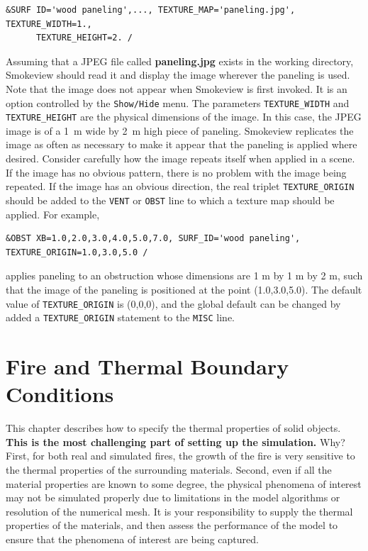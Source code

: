 \documentclass[11pt]{book}
\newcommand{\ct}{\tt\small}
\begin{document}
\footnotesize
\begin{verbatim}
&SURF ID='wood paneling',..., TEXTURE_MAP='paneling.jpg', TEXTURE_WIDTH=1.,
      TEXTURE_HEIGHT=2. /
\end{verbatim}
\normalsize
Assuming that a JPEG file called {\bf paneling.jpg} exists in the
working directory, Smokeview should read it and display the image
wherever the paneling is used.
Note that the image does not appear when Smokeview is first invoked. It is an option controlled by
the {\ct Show/Hide} menu. The parameters {\ct TEXTURE\_WIDTH}
and {\ct TEXTURE\_HEIGHT} are the physical dimensions of the image. In this case,
the JPEG image is of a 1~m wide by 2~m high piece of
paneling. Smokeview replicates the image as often as necessary to
make it appear that the paneling is applied where desired.
Consider carefully how the image repeats itself when
applied in a scene. If the image has no obvious pattern, there is no
problem with the image being repeated. If the image has an obvious
direction, the real triplet {\ct TEXTURE\_ORIGIN} should be added to
the {\ct VENT} or {\ct OBST} line to which a texture map
should be applied. For example,

\footnotesize
\begin{verbatim}
&OBST XB=1.0,2.0,3.0,4.0,5.0,7.0, SURF_ID='wood paneling', TEXTURE_ORIGIN=1.0,3.0,5.0 /
\end{verbatim}
\normalsize
applies paneling to an obstruction whose dimensions are 1 m by
1 m by 2 m, such that the image of the paneling is positioned
at the point (1.0,3.0,5.0). The default value of {\ct TEXTURE\_ORIGIN}
is (0,0,0), and the global default can be changed by added a
{\ct TEXTURE\_ORIGIN} statement to the {\ct MISC} line.






\chapter{Fire and Thermal Boundary Conditions}

This chapter describes how to specify the thermal properties of solid objects. {\bf This is
the most challenging part of setting up the simulation.} Why?  First,
for both real and simulated fires, the growth of the fire is very
sensitive to the thermal properties of the surrounding
materials. Second, even if all the material properties are known to
some degree, the physical phenomena of interest may not be simulated
properly due to limitations in the model algorithms or resolution of
the numerical mesh. It is your responsibility to supply the thermal
properties of the materials, and then assess the performance of the
model to ensure that the phenomena of interest are being captured.
\end{document}
